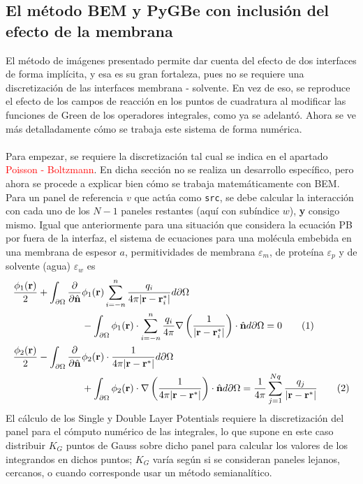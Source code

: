 \documentclass[12pt, oneside, numbers, spanish]{ezthesis}
\newcommand\numberthis{\addtocounter{equation}{1}\tag{\theequation}}
\numberwithin{equation}{section}
\begin{document}
\subsection{El método BEM y PyGBe con inclusión del efecto de la membrana}
El método de imágenes presentado permite dar cuenta del efecto de dos interfaces de forma implícita, y esa es su gran fortaleza, pues no se requiere una discretización de las interfaces membrana - solvente. En vez de eso, se reproduce el efecto de los campos de reacción en los puntos de cuadratura al modificar las funciones de Green de los operadores integrales, como ya se adelantó. Ahora se ve más detalladamente cómo se trabaja este sistema de forma numérica.\\\\
Para empezar, se requiere la discretización tal cual se indica en el apartado \textcolor{red}{Poisson - Boltzmann}. En dicha sección no se realiza un desarrollo específico, pero ahora se procede a explicar bien cómo se trabaja matemáticamente con BEM. Para un panel de referencia $v$ que actúa como \texttt{src}, se debe calcular la interacción con cada uno de los $N-1$ paneles restantes (aquí con subíndice $w$), \textbf{y} consigo mismo. Igual que anteriormente para una situación que considera la ecuación PB por fuera de la interfaz, el sistema de ecuaciones para una molécula embebida en una membrana de espesor $a$, permitividades de membrana $\varepsilon_m$, de proteína $\varepsilon_p$ y de solvente (agua) $\varepsilon_w$ es
\begin{align*}
\frac{\phi_1(\mathbf{r})}{2} + \int_{\partial\Omega}\frac{\partial}{\partial\hat{\mathbf{n}}}&\phi_1(\mathbf{r})\sum_{i=-n}^{n}\frac{q_i}{4\pi|\mathbf{r} - \mathbf{r}_i^*|} d\partial\Omega \\
& - \int_{\partial\Omega}\phi_1(\mathbf{r})\cdot\sum_{i = -n}^{n}\frac{q_i}{4\pi}\nabla\left(\frac{1}{|\mathbf{r} - \mathbf{r}_i^*|}\right)\cdot\hat{\mathbf{n}} d\partial\Omega = 0\numberthis \\
\frac{\phi_2(\mathbf{r})}{2} - \int_{\partial\Omega}\frac{\partial}{\partial\hat{\mathbf{n}}}&\phi_2(\mathbf{r})\cdot\frac{1}{4\pi|\mathbf{r} - \mathbf{r}^*|} d\partial\Omega \\
& + \int_{\partial\Omega}\phi_2(\mathbf{r})\cdot\nabla\left(\frac{1}{4\pi|\mathbf{r} - \mathbf{r}^*|}\right)\cdot\hat{\mathbf{n}} d\partial\Omega = \frac{1}{4\pi}\sum_{j = 1}^{Nq}\frac{q_j}{|\mathbf{r} - \mathbf{r}^*|} \numberthis
\end{align*}
El cálculo de los Single y Double Layer Potentials requiere la discretización del panel para el cómputo numérico de las integrales, lo que supone en este caso distribuir $K_G$ puntos de Gauss sobre dicho panel para calcular los valores de los integrandos en dichos puntos; $K_G$ varía según si se consideran paneles lejanos, cercanos, o cuando corresponde usar un método semianalítico.
\end{document}
